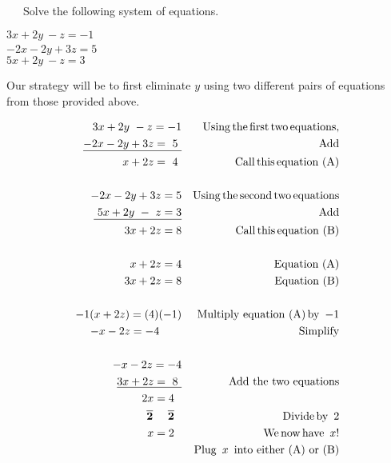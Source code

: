 \begin{example}~~~Solve the following system of equations.
\begin{center}
		$3 x + 2 y~ - z=- 1~$\\
		$- 2 x - 2 y + 3 z=5$~~~~~~~\\
		$5 x + 2 y~ - z=3~~~~$
\end{center}
Our strategy will be to first eliminate $y$ using two different pairs of equations from those provided above.

	\begin{eqnarray*}
    3 x + 2 y~ - z = - 1 &  & \tmop{Using} \tmop{the} \tmop{first} \tmop{two}
    \tmop{equations},\\
    \underline{- 2 x - 2 y + 3 z = ~5~} &  & \tmop{Add} \\
    x + 2 z = ~4~ &  & \tmop{Call} \tmop{this} \tmop{equation~(A)}\\
    &  & \\
    - 2 x - 2 y + 3 z = 5 &  & \tmop{Using} \tmop{the} \tmop{second}
    \tmop{two} \tmop{equations}\\
    \underline{~5 x + 2 y~ -~ z = 3} &  & \tmop{Add}\\
    3 x + 2 z = 8 &  & \tmop{Call} \tmop{this} \tmop{equation~(B)}\\
    &  & \\
    x + 2 z = 4 &  & \text{Equation~(A)}\\
    3 x + 2 z = 8 &  & \text{Equation~(B)}\\
    &  & \\
    - 1 (x + 2 z) = (4) (- 1) &  & \tmop{Multiply~equation~(A)} \tmop{by~} - 1\\
    - x - 2 z = - 4~~~~~~ &  & \tmop{Simplify}\\
    &  & \\
    - x - 2 z = - 4 &  &\\
    \underline{3 x + 2 z = ~8~} &  & \text{Add~the~two~equations}\\
    2 x = 4~~ &  & \\
    \tmmathbf{\overline{2} ~~~~ \overline{2}}~~ &  &\tmop{Divide} \tmop{by~} 2 \\
    x = 2~~ &  & \tmop{We} \tmop{now} \tmop{have~} x!\\
    &  &  \tmop{Plug~} x \tmop{~into~either~(A)~or~(B)}\\

\end{eqnarray*}
\end{example}
